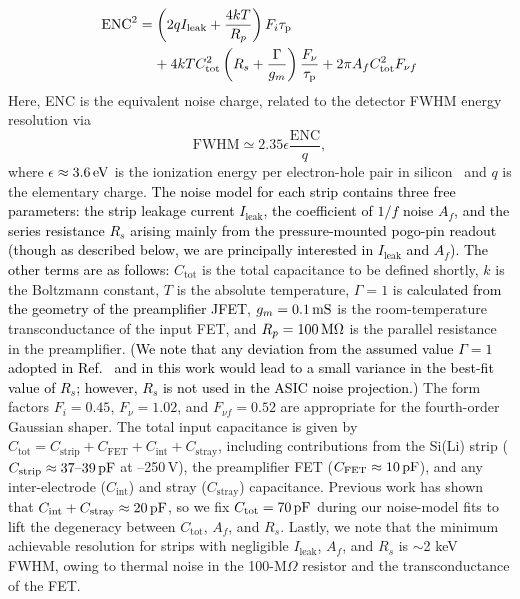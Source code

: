 \documentclass[journal]{IEEEtran}
\newcommand{\red}[1]{\textcolor{black}{#1}}
\begin{document}
\begin{align}{\label{eqn:preamp_noisemodel}}
    \text{ENC}^2 &= \left(2qI_\text{leak}+\frac{4kT}{R_p}\right)F_i\tau_\text{p} \\
    &\;\;\;\;+4kTC_\text{tot}^2\left(R_s+\frac{\Gamma}{g_m}\right)\frac{F_\nu}{\tau_\text{p}}+2\pi A_f C_\text{tot}^2 F_{\nu f} \nonumber
\end{align}
Here, ENC is the equivalent noise charge, related to the detector FWHM energy resolution via 
\begin{equation}
    \text{FWHM} \simeq 2.35\epsilon\frac{\text{ENC}}{q},
\end{equation}
where ${\epsilon \approx 3.6\text{\,eV}}$ is the ionization energy per electron-hole pair in silicon~\cite{Klein:1968a} and $q$ is the elementary charge. \red{The noise model for each strip contains three free parameters: the strip leakage current $I_\text{leak}$, the coefficient of $1/f$ noise $A_f$, and the series resistance $R_s$ arising mainly from the pressure-mounted pogo-pin readout (though as described below, we are principally interested in $I_\text{leak}$ and $A_f$). The other terms are as follows:} $C_\text{tot}$ is the total capacitance to be defined shortly, $k$ is the Boltzmann constant, $T$ is the absolute temperature, $\Gamma = 1$ is \red{calculated from the geometry of the preamplifier JFET}, $g_m = 0.1\text{\,mS}$ is the room-temperature transconductance of the input FET, and $R_p = 100\text{\,M}\Omega$ is the parallel resistance in the preamplifier. \red{(We note that any deviation from the assumed value $\Gamma = 1$ adopted in Ref.~\cite{Rogers:2019avj} and in this work would lead to a small variance in the best-fit value of $R_s$; however, $R_s$ is not used in the ASIC noise projection.)} The form factors $F_i = 0.45$, $F_\nu = 1.02$, and $F_{\nu f} = 0.52$ are appropriate for the fourth-order Gaussian shaper. The total input capacitance is given by $C_\text{tot} = C_\text{strip} + C_\text{FET} + C_\text{int} + C_\text{stray}$, including contributions from the Si(Li) strip ($C_\text{strip} \approx 37 \text{--39\,pF}$ at --250\,V), the preamplifier FET ($C_\text{FET} \approx 10 \text{\,pF}$), and any inter-electrode ($C_\text{int}$) and stray ($C_\text{stray}$) capacitance. Previous work \cite{Rogers:2019avj} has shown that $C_\text{int} + C_\text{stray} \approx 20\text{\,pF}$, so we fix $C_\text{tot} = 70\text{\,pF}$ during our noise-model fits to \red{lift} the degeneracy between $C_\text{tot}$, $A_f$, and $R_s$. Lastly, we note that the minimum achievable resolution for strips with negligible $I_\text{leak}$, $A_f$, and $R_s$ is ${\sim}$2 keV FWHM, owing to thermal noise in the 100-M$\Omega$ resistor and the transconductance of the FET.
\end{document}

